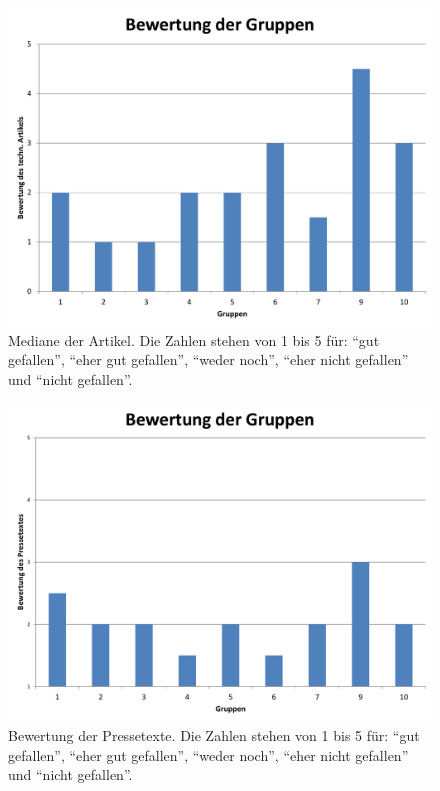 \begin{figure}[h!tbp]
    \begin{center}
        \includegraphics[width=\textwidth]{images/bewertungen-artikel}
    \end{center}
    \caption{Mediane der Artikel. Die Zahlen 
    stehen von 1 bis 5 für: \enquote{gut gefallen}, \enquote{eher gut 
    gefallen}, \enquote{weder noch}, \enquote{eher nicht gefallen} und 
    \enquote{nicht gefallen}.}
    \label{fig:mediane}
\end{figure}

\begin{figure}[h!tbp]
    \begin{center}
        \includegraphics[width=\textwidth]{images/bewertungen}
    \end{center}
    \caption{Bewertung der Pressetexte. Die Zahlen 
    stehen von 1 bis 5 für: \enquote{gut gefallen}, \enquote{eher gut 
    gefallen}, \enquote{weder noch}, \enquote{eher nicht gefallen} und 
    \enquote{nicht gefallen}.}
    \label{fig:bewertungen}
\end{figure}

